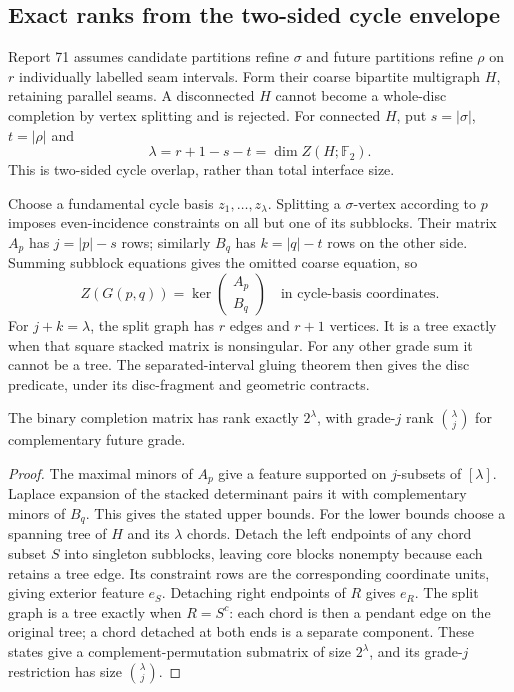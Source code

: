 \subsection{Exact ranks from the two-sided cycle envelope}

Report 71 assumes candidate partitions refine $\sigma$ and future partitions
refine $\rho$ on $r$ individually labelled seam intervals. Form their coarse
bipartite multigraph $H$, retaining parallel seams. A disconnected $H$ cannot
become a whole-disc completion by vertex splitting and is rejected. For
connected $H$, put $s=|\sigma|$, $t=|\rho|$ and
\[
 \lambda=r+1-s-t=\dim Z(H;\mathbb F_2).
\]
This is two-sided cycle overlap, rather than total interface size.

Choose a fundamental cycle basis $z_1,\ldots,z_\lambda$. Splitting a
$\sigma$-vertex according to $p$ imposes even-incidence constraints on all
but one of its subblocks. Their matrix $A_p$ has $j=|p|-s$ rows; similarly
$B_q$ has $k=|q|-t$ rows on the other side. Summing subblock equations gives
the omitted coarse equation, so
\[
 Z(G(p,q))=\ker\begin{pmatrix}A_p\\B_q\end{pmatrix}
               \quad\text{in cycle-basis coordinates}.
\]
For $j+k=\lambda$, the split graph has $r$ edges and $r+1$ vertices. It
is a tree exactly when that square stacked matrix is nonsingular. For any
other grade sum it cannot be a tree. The separated-interval gluing theorem
then gives the disc predicate, under its disc-fragment and geometric contracts.

\begin{proposition}
The binary completion matrix has rank exactly $2^\lambda$, with
grade-$j$ rank $\binom\lambda j$ for complementary future grade.
\end{proposition}
\begin{proof}
The maximal minors of $A_p$ give a feature supported on $j$-subsets of
$[\lambda]$. Laplace expansion of the stacked determinant pairs it with
complementary minors of $B_q$. This gives the stated upper bounds.
For the lower bounds choose a spanning tree of $H$ and its $\lambda$ chords.
Detach the left endpoints of any chord subset $S$ into singleton subblocks,
leaving core blocks nonempty because each retains a tree edge. Its constraint
rows are the corresponding coordinate units, giving exterior feature $e_S$.
Detaching right endpoints of $R$ gives $e_R$. The split graph is a tree
exactly when $R=S^c$: each chord is then a pendant edge on the original
tree; a chord detached at both ends is a separate component. These states
give a complement-permutation submatrix of size $2^\lambda$, and its
grade-$j$ restriction has size $\binom\lambda j$.
\end{proof}

